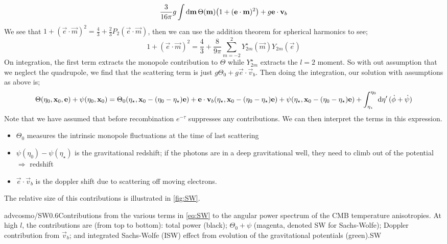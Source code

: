 \begin{equation*}
\frac{3}{16\pi}g\int{\upd{\vec{m}}\Theta(\vec{m})\left(1 + (\vec{e}\cdot\vec{m})^2\right)} + g\vec{e}\cdot \vec{v}_b
\end{equation*}
We see that $1 + (\vec{e}\cdot\vec{m})^2 = \tfrac{4}{3} + \tfrac{2}{3}P_2(\vec{e}\cdot\vec{m})$, then we can use the addition theorem for spherical harmonics to see;
\begin{equation*}
1 + (\vec{e}\cdot\vec{m})^2 = \frac{4}{3} + \frac{8}{9\pi} \sum_{m = -2}^{2}{Y_{2m}^{\star}(\vec{m})Y_{2m}(\vec{e})}
\end{equation*}
On integration, the first term extracts the monopole contribution to $\Theta$ while $Y^{\star}_{2m}$ extracts the $l = 2$ moment. So with out assumption that we neglect the quadrupole, we find that the scattering term is just $g\Theta_0 + g\vec{e}\cdot\vec{v}_b$. Then doing the integration, our solution with assumptions as above is;
\begin{dmath}
\label{eq:SW}
\Theta(\eta_0, \vec{x}_0, \vec{e}) + \psi(\eta_0, \vec{x}_0) = \Theta_0\left(\eta_\star, \vec{x}_0 - (\eta_0 - \eta_\star)\vec{e}\right) + \vec{e}\cdot\vec{v}_b\left(\eta_\star, \vec{x}_0 - (\eta_0 - \eta_\star)\vec{e}\right) + \psi\left(\eta_\star, \vec{x}_0 - (\eta_0 - \eta_\star)\vec{e}\right) + \int_{\eta_\star}^{\eta_0}{\upd{\eta\pr}(\dot{\phi} + \dot{\psi})}
\end{dmath}
Note that we have assumed that before recombination $e^{-\tau}$ suppresses any contributions. We can then interpret the terms in this expression.
\begin{itemize}
\item $\Theta_0$ measures the intrinsic monopole fluctuations at the time of last scattering
\item $\psi(\eta_0) - \psi(\eta_\star)$ is the gravitational redshift; if the photons are in a deep gravitational well, they need to climb out of the potential $\Rightarrow$ redshift
\item $\vec{e}\cdot\vec{v}_b$ is the doppler shift due to scattering off moving electrons.
\end{itemize}
The relative size of this contributions is illustrated in \autoref{fig:SW}.
\begin{mygraphic}{advcosmo/SW}{0.6}{Contributions from the various terms in \eqref{eq:SW} to the angular power spectrum of the CMB temperature anisotropies. At high $l$, the contributions are (from top to bottom): total power (black); $\Theta_0 + \psi$ (magenta, denoted SW for Sachs-Wolfe); Doppler contribution from $\vec{v}_b$; and integrated Sachs-Wolfe (ISW) effect from evolution of the gravitational potentials (green).}{SW}\end{mygraphic}
